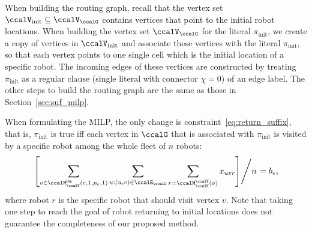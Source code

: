\documentclass[Afour,sageh,times]{sagej}
\newcommand{\auto}[1]{\ccalA_{\textup{#1}}}
\newcommand{\autop}{\ccalA_{\phi}}
\begin{document}
{{When building the routing graph, recall that the vertex set $\ccalV_\text{init} \subseteq \ccalV_\ccalG$ contains vertices that point to the initial robot locations. When building the vertex set $\ccalV_\ccalG$ for the literal $\pi_{\text{init}}$, we create a copy of vertices in $\ccalV_{\text{init}}$ and associate these vertices  with the literal $\pi_{\text{init}}$, so that each vertex points to one single cell which is the initial location of a specific robot. The incoming edges of these vertices are constructed by treating $\pi_{\text{init}}$ as a regular clause (single literal with connector $\chi=0$) of an edge label. The other steps to build the routing graph are the same as those in Section~\ref{sec:suf_milp}.

When formulating the MILP, the only change is constraint~\eqref{eq:return_suffix}, that is, $\pi_{\text{init}}$ is true iff each vertex in $\ccalG$ that is associated with  $\pi_{\text{init}}$ is visited by a specific robot among the whole fleet of $n$ robots:
\begin{align}
  \left.   \left[ \sum_{v \in \ccalM_\ccalV^\mathsf{lits}(e, 1, p_e, 1)}   \sum_{u: (u,v) \in \ccalE_\ccalG}     \sum_{r = \ccalM_{\ccalK}^\ccalV(v) }   x_{uvr} \right] \middle/ {n} \right. = b_e,
 \end{align}
where robot $r$ is the specific robot that should visit vertex $v$. Note that taking one step to reach the goal of robot returning to initial locations  does not guarantee the completeness of our proposed method.




}}
\end{document}
